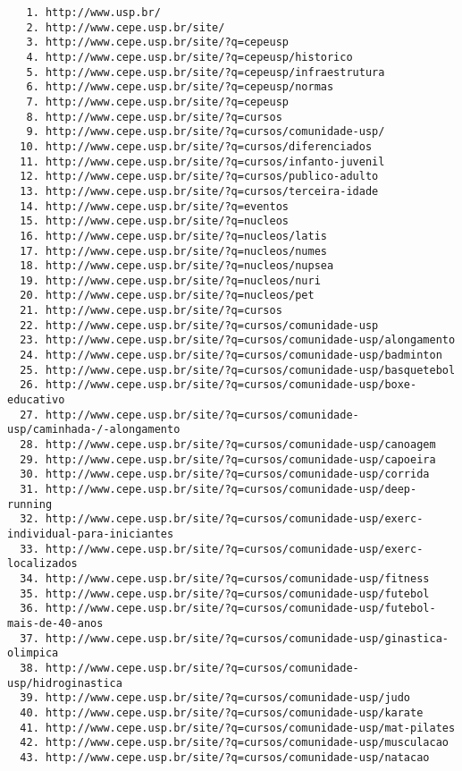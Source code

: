 \documentclass[brazil]{article}
\begin{document}
\begin{small}
\begin{verbatim}
   1. http://www.usp.br/
   2. http://www.cepe.usp.br/site/
   3. http://www.cepe.usp.br/site/?q=cepeusp
   4. http://www.cepe.usp.br/site/?q=cepeusp/historico
   5. http://www.cepe.usp.br/site/?q=cepeusp/infraestrutura
   6. http://www.cepe.usp.br/site/?q=cepeusp/normas
   7. http://www.cepe.usp.br/site/?q=cepeusp
   8. http://www.cepe.usp.br/site/?q=cursos
   9. http://www.cepe.usp.br/site/?q=cursos/comunidade-usp/
  10. http://www.cepe.usp.br/site/?q=cursos/diferenciados
  11. http://www.cepe.usp.br/site/?q=cursos/infanto-juvenil
  12. http://www.cepe.usp.br/site/?q=cursos/publico-adulto
  13. http://www.cepe.usp.br/site/?q=cursos/terceira-idade
  14. http://www.cepe.usp.br/site/?q=eventos
  15. http://www.cepe.usp.br/site/?q=nucleos
  16. http://www.cepe.usp.br/site/?q=nucleos/latis
  17. http://www.cepe.usp.br/site/?q=nucleos/numes
  18. http://www.cepe.usp.br/site/?q=nucleos/nupsea
  19. http://www.cepe.usp.br/site/?q=nucleos/nuri
  20. http://www.cepe.usp.br/site/?q=nucleos/pet
  21. http://www.cepe.usp.br/site/?q=cursos
  22. http://www.cepe.usp.br/site/?q=cursos/comunidade-usp
  23. http://www.cepe.usp.br/site/?q=cursos/comunidade-usp/alongamento
  24. http://www.cepe.usp.br/site/?q=cursos/comunidade-usp/badminton
  25. http://www.cepe.usp.br/site/?q=cursos/comunidade-usp/basquetebol
  26. http://www.cepe.usp.br/site/?q=cursos/comunidade-usp/boxe-educativo
  27. http://www.cepe.usp.br/site/?q=cursos/comunidade-usp/caminhada-/-alongamento
  28. http://www.cepe.usp.br/site/?q=cursos/comunidade-usp/canoagem
  29. http://www.cepe.usp.br/site/?q=cursos/comunidade-usp/capoeira
  30. http://www.cepe.usp.br/site/?q=cursos/comunidade-usp/corrida
  31. http://www.cepe.usp.br/site/?q=cursos/comunidade-usp/deep-running
  32. http://www.cepe.usp.br/site/?q=cursos/comunidade-usp/exerc-individual-para-iniciantes
  33. http://www.cepe.usp.br/site/?q=cursos/comunidade-usp/exerc-localizados
  34. http://www.cepe.usp.br/site/?q=cursos/comunidade-usp/fitness
  35. http://www.cepe.usp.br/site/?q=cursos/comunidade-usp/futebol
  36. http://www.cepe.usp.br/site/?q=cursos/comunidade-usp/futebol-mais-de-40-anos
  37. http://www.cepe.usp.br/site/?q=cursos/comunidade-usp/ginastica-olimpica
  38. http://www.cepe.usp.br/site/?q=cursos/comunidade-usp/hidroginastica
  39. http://www.cepe.usp.br/site/?q=cursos/comunidade-usp/judo
  40. http://www.cepe.usp.br/site/?q=cursos/comunidade-usp/karate
  41. http://www.cepe.usp.br/site/?q=cursos/comunidade-usp/mat-pilates
  42. http://www.cepe.usp.br/site/?q=cursos/comunidade-usp/musculacao
  43. http://www.cepe.usp.br/site/?q=cursos/comunidade-usp/natacao

\end{verbatim}
\end{small}
\end{document}
